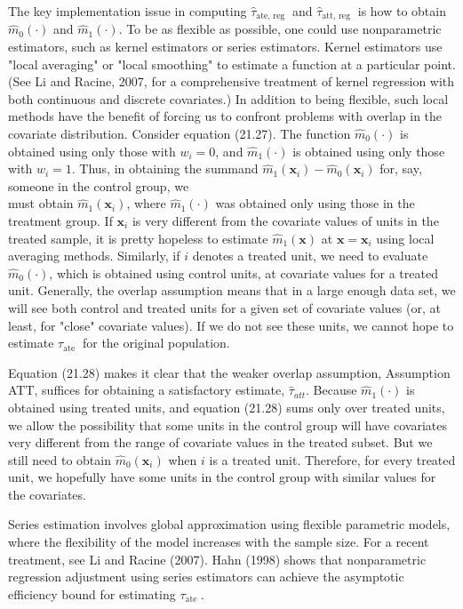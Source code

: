 \documentclass[10pt]{article}
\begin{document}
The key implementation issue in computing $\hat{\tau}_{\text {ate, reg }}$ and $\hat{\tau}_{\text {att, reg }}$ is how to obtain $\hat{m}_{0}(\cdot)$ and $\hat{m}_{1}(\cdot)$. To be as flexible as possible, one could use nonparametric estimators, such as kernel estimators or series estimators. Kernel estimators use "local averaging" or "local smoothing" to estimate a function at a particular point. (See Li and Racine, 2007, for a comprehensive treatment of kernel regression with both continuous and discrete covariates.) In addition to being flexible, such local methods have the benefit of forcing us to confront problems with overlap in the covariate distribution. Consider equation (21.27). The function $\hat{m}_{0}(\cdot)$ is obtained using only those with $w_{i}=0$, and $\hat{m}_{1}(\cdot)$ is obtained using only those with $w_{i}=1$. Thus, in obtaining the summand $\hat{m}_{1}\left(\mathbf{x}_{i}\right)-\hat{m}_{0}\left(\mathbf{x}_{i}\right)$ for, say, someone in the control group, we\\
must obtain $\hat{m}_{1}\left(\mathbf{x}_{i}\right)$, where $\hat{m}_{1}(\cdot)$ was obtained only using those in the treatment group. If $\mathbf{x}_{i}$ is very different from the covariate values of units in the treated sample, it is pretty hopeless to estimate $\hat{m}_{1}(\mathbf{x})$ at $\mathbf{x}=\mathbf{x}_{i}$ using local averaging methods. Similarly, if $i$ denotes a treated unit, we need to evaluate $\hat{m}_{0}(\cdot)$, which is obtained using control units, at covariate values for a treated unit. Generally, the overlap assumption means that in a large enough data set, we will see both control and treated units for a given set of covariate values (or, at least, for "close" covariate values). If we do not see these units, we cannot hope to estimate $\tau_{\text {ate }}$ for the original population.

Equation (21.28) makes it clear that the weaker overlap assumption, Assumption ATT, suffices for obtaining a satisfactory estimate, $\hat{\tau}_{a t t}$. Because $\hat{m}_{1}(\cdot)$ is obtained using treated units, and equation (21.28) sums only over treated units, we allow the possibility that some units in the control group will have covariates very different from the range of covariate values in the treated subset. But we still need to obtain $\hat{m}_{0}\left(\mathbf{x}_{i}\right)$ when $i$ is a treated unit. Therefore, for every treated unit, we hopefully have some units in the control group with similar values for the covariates.

Series estimation involves global approximation using flexible parametric models, where the flexibility of the model increases with the sample size. For a recent treatment, see Li and Racine (2007). Hahn (1998) shows that nonparametric regression adjustment using series estimators can achieve the asymptotic efficiency bound for estimating $\tau_{\text {ate }}$.
\end{document}
